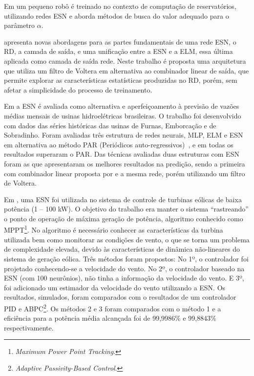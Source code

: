 Em  um pequeno robô é treinado no contexto de computação de reservatórios, utilizando redes ESN e aborda métodos de busca do valor adequado para o parâmetro $\alpha$.

 apresenta novas abordagens para as partes fundamentais de uma rede ESN, o RD, a camada de saída, e uma unificação entre a ESN e a ELM, essa última aplicada como camada de saída rede. Neste trabalho é proposta uma arquitetura que utiliza um filtro de Voltera em alternativa ao combinador linear de saída, que permite explorar as características estatísticas produzidas no RD, porém, sem afetar a simplicidade do processo de treinamento.

Em  a ESN é avaliada como alternativa e aperfeiçoamento à previsão de vazões médias mensais de usinas hidroelétricas brasileiras. O trabalho foi desenvolvido com dados das séries históricas das usinas de Furnas, Emborcação e de Sobradinho. Foram avaliadas três estrutura de redes neurais, MLP, ELM e ESN em alternativa ao método PAR (Periódicos auto-regressivos)~\cite{thesis:reis2013}, e em todas os resultados superaram o PAR. Das técnicas avaliadas duas estruturas com ESN foram as que apresentaram os melhores resultados na predição, sendo a primeira com combinador linear proposta por  e a mesma rede, porém utilizando um  filtro de Voltera.

Em , uma ESN foi utilizada no sistema de controle de turbinas eólicas de baixa potência (1 -- 100 kW). O objetivo do trabalho era manter o sistema ``rastreando'' o ponto de operação de máxima geração de potência, algoritmo conhecido como MPPT\footnote{\textit{Maximum Power Point Tracking}.}.  No algoritmo é necessário conhecer as características da turbina utilizada bem como monitorar as condições de vento, o que se torna um problema de complexidade elevada, devido às características de dinâmica não-lineares do sistema de geração eólica. Três métodos foram propostos: No 1º, o controlador foi projetado conhecendo-se a velocidade do vento. No 2º, o controlador baseado na ESN (com 100 neurônios), não tinha a informação da velocidade do vento. E 3º, foi adicionado um estimador da velocidade do vento utilizando a ESN. Os resultados, simulados, foram comparados com o resultados de um controlador PID e ABPC\footnote{\textit{Adaptive Passivity-Based Control}.}. Os métodos 2 e 3 foram comparados com o método 1 e a eficiência para a potência média alcançada foi de 99,9986\% e 99,8843\% respectivamente. 

